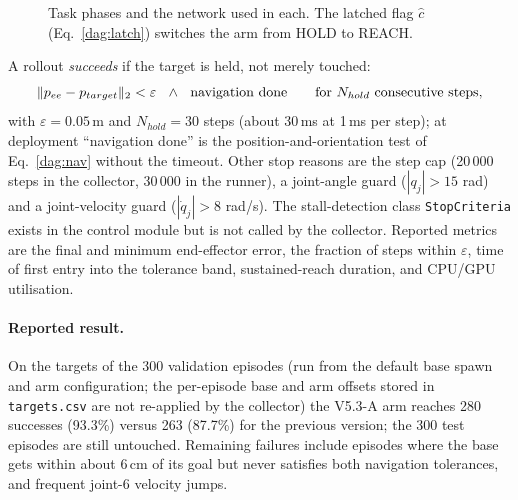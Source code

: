 \begin{figure}[ht]
\centering
{}
\caption{Task phases and the network used in each. The latched flag $\hat c$ (Eq.~\eqref{dag:latch}) switches the arm from HOLD to REACH.}
\label{dag:phases}
\end{figure}

A rollout \emph{succeeds} if the target is held, not merely touched:
\begin{equation}
  \dagnorm{p_{ee}-p_{target}}<\varepsilon\ \ \wedge\ \ \text{navigation done}\qquad\text{for }N_{hold}\text{ consecutive steps},
  \label{dag:succ}
\end{equation}
with $\varepsilon=0.05$\,m and $N_{hold}=30$ steps (about 30\,ms at 1\,ms per step); at deployment ``navigation done'' is the position-and-orientation test of Eq.~\eqref{dag:nav} without the timeout. Other stop reasons are the step cap (20\,000 steps in the collector, 30\,000 in the runner), a joint-angle guard ($|q_j|>15$ rad) and a joint-velocity guard ($|\dot q_j|>8$ rad/s). The stall-detection class \texttt{StopCriteria} exists in the control module but is not called by the collector. Reported metrics are the final and minimum end-effector error, the fraction of steps within $\varepsilon$, time of first entry into the tolerance band, sustained-reach duration, and CPU/GPU utilisation.

\paragraph{Reported result.} On the targets of the 300 validation episodes (run from the default base spawn and arm configuration; the per-episode base and arm offsets stored in \texttt{targets.csv} are not re-applied by the collector) the V5.3-A arm reaches 280 successes (93.3\%) versus 263 (87.7\%) for the previous version; the 300 test episodes are still untouched. Remaining failures include episodes where the base gets within about 6\,cm of its goal but never satisfies both navigation tolerances, and frequent joint-6 velocity jumps.

